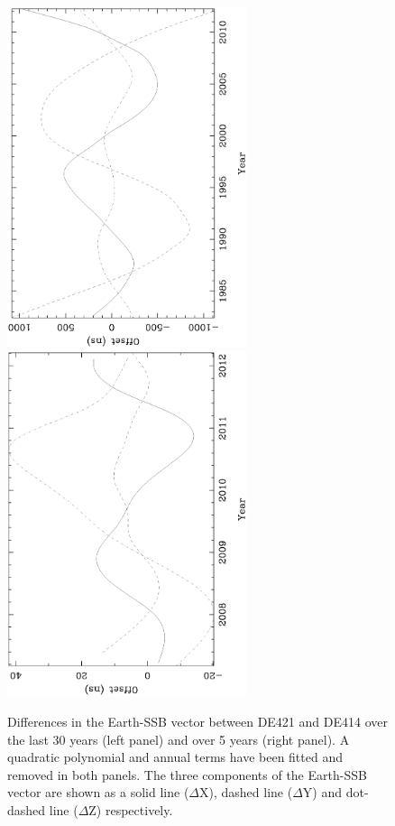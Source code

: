 \documentclass{raa}            %
\begin{document}
\begin{figure}
\includegraphics[angle=-90,width=7cm]{ephem1.ps}
\includegraphics[angle=-90,width=7cm]{ephem2.ps}
\caption{Differences in the Earth-SSB vector between DE421 and DE414 over the last 30 years (left panel) and over 5 years (right panel). A quadratic polynomial and annual terms have been fitted and removed in both panels. The three components of the Earth-SSB vector are shown as a solid line ($\Delta$X), dashed line ($\Delta$Y) and dot-dashed line ($\Delta$Z) respectively.} \label{fg:ephDiff}
\end{figure}
\end{document}

